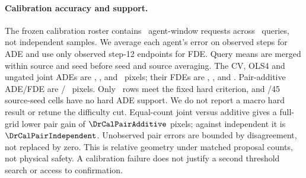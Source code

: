 \paragraph{Calibration accuracy and support.}
The frozen calibration roster contains \DrCalRows\ agent-window
requests across \DrCalQueries\ queries, not independent samples.
We average each agent's error on observed steps for ADE and use
only observed step-12 endpoints for FDE. Query means are merged
within source and seed before seed and source averaging.
The CV, OLS4 and ungated joint ADEs are \DrCalAdeCV, \DrCalAdeOLS,
and \DrCalAdeJoint\ pixels; their FDEs are \DrCalFdeCV, \DrCalFdeOLS,
and \DrCalFdeJoint. Pair-additive ADE/FDE are \DrCalAdeAdditive/
\DrCalFdeAdditive\ pixels. Only \DrCalHardRows\ rows meet the fixed
hard criterion, and \DrCalHardMissing/45 source-seed cells have no
hard ADE support. We do not report a macro hard result or retune
the difficulty cut. Equal-count joint versus additive gives a
full-grid lower pair gain of $\DrCalPairAdditive$ pixels; against
independent it is $\DrCalPairIndependent$. Unobserved pair errors
are bounded by disagreement, not replaced by zero. This is
relative geometry under matched proposal counts, not physical
safety. A calibration failure does not justify a second threshold
search or access to confirmation.
